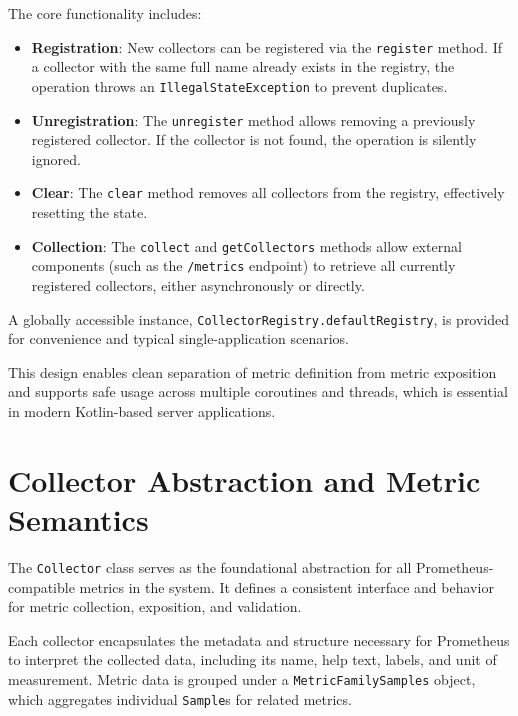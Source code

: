The core functionality includes:
\begin{itemize}
    \item \textbf{Registration}: New collectors can be registered via the \texttt{register} method. If a collector with the same full name already exists in the registry, the operation throws an \texttt{IllegalStateException} to prevent duplicates.
    
    \item \textbf{Unregistration}: The \texttt{unregister} method allows removing a previously registered collector. If the collector is not found, the operation is silently ignored.
    
    \item \textbf{Clear}: The \texttt{clear} method removes all collectors from the registry, effectively resetting the state.
    
    \item \textbf{Collection}: The \texttt{collect} and \texttt{getCollectors} methods allow external components (such as the \texttt{/metrics} endpoint) to retrieve all currently registered collectors, either asynchronously or directly.
\end{itemize}

A globally accessible instance, \texttt{CollectorRegistry.defaultRegistry}, is provided for convenience and typical single-application scenarios.

This design enables clean separation of metric definition from metric exposition and supports safe usage across multiple coroutines and threads, which is essential in modern Kotlin-based server applications.

\section{Collector Abstraction and Metric Semantics}

The \texttt{Collector} class serves as the foundational abstraction for all Prometheus-compatible metrics in the system. It defines a consistent interface and behavior for metric collection, exposition, and validation.

Each collector encapsulates the metadata and structure necessary for Prometheus to interpret the collected data, including its name, help text, labels, and unit of measurement. Metric data is grouped under a \texttt{MetricFamilySamples} object, which aggregates individual \texttt{Sample}s for related metrics.

